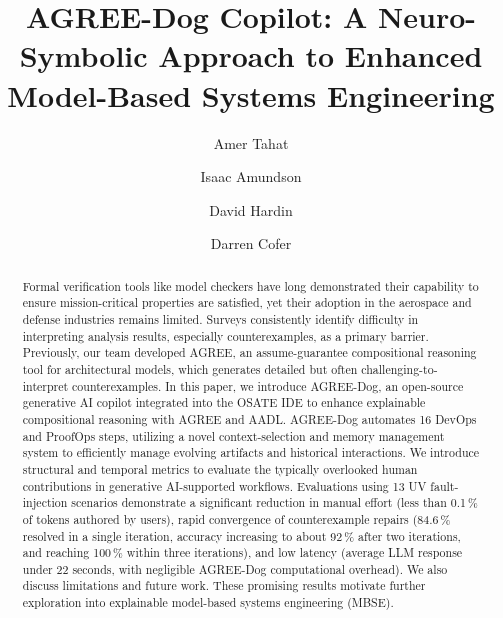 \documentclass{llncs}
\begin{document}
%
\title{AGREE-Dog Copilot: A Neuro-Symbolic Approach to Enhanced Model-Based Systems Engineering}%
%
%
\author{Amer Tahat\and
  Isaac Amundson \and
  David Hardin \and
  Darren Cofer}
%
%
%

\maketitle

\begin{abstract}
Formal verification tools like model checkers have long demonstrated their capability to ensure mission-critical properties are satisfied, yet their adoption in the aerospace and defense industries remains limited. Surveys consistently identify difficulty in interpreting analysis results, especially counterexamples, as a primary barrier. Previously, our team developed AGREE, an assume-guarantee compositional reasoning tool for architectural models, which generates detailed but often challenging-to-interpret counterexamples.
%
In this paper, we introduce AGREE-Dog, an open-source generative AI copilot integrated into the OSATE IDE to enhance explainable compositional reasoning with AGREE and AADL. AGREE-Dog automates 16 DevOps and ProofOps steps, utilizing a novel context-selection and memory management system to efficiently manage evolving artifacts and historical interactions.
%
We introduce structural and temporal metrics to evaluate the typically overlooked human contributions in generative AI-supported workflows. Evaluations using 13 UV fault-injection scenarios demonstrate a significant reduction in manual effort (less than 0.1\,\% of tokens authored by users), rapid convergence of counterexample repairs (84.6\,\% resolved in a single iteration, accuracy increasing to about 92\,\% after two iterations, and reaching 100\,\% within three iterations), and low latency (average LLM response under 22 seconds, with negligible AGREE-Dog computational overhead). We also discuss limitations and future work. These promising results motivate further exploration into explainable model-based systems engineering (MBSE).
\end{abstract}
\end{document}
